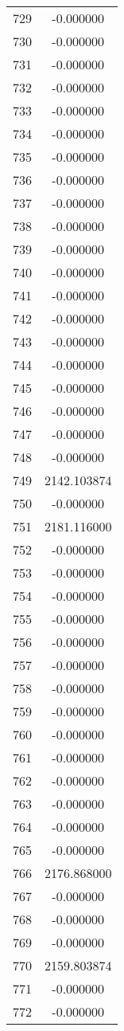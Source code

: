 \documentclass[12pt]{article}
\begin{document}
\begin{longtable}{@{}cc@{}}
729 & -0.000000 \\
730 & -0.000000 \\
731 & -0.000000 \\
732 & -0.000000 \\
733 & -0.000000 \\
734 & -0.000000 \\
735 & -0.000000 \\
736 & -0.000000 \\
737 & -0.000000 \\
738 & -0.000000 \\
739 & -0.000000 \\
740 & -0.000000 \\
741 & -0.000000 \\
742 & -0.000000 \\
743 & -0.000000 \\
744 & -0.000000 \\
745 & -0.000000 \\
746 & -0.000000 \\
747 & -0.000000 \\
748 & -0.000000 \\
749 & 2142.103874 \\
750 & -0.000000 \\
751 & 2181.116000 \\
752 & -0.000000 \\
753 & -0.000000 \\
754 & -0.000000 \\
755 & -0.000000 \\
756 & -0.000000 \\
757 & -0.000000 \\
758 & -0.000000 \\
759 & -0.000000 \\
760 & -0.000000 \\
761 & -0.000000 \\
762 & -0.000000 \\
763 & -0.000000 \\
764 & -0.000000 \\
765 & -0.000000 \\
766 & 2176.868000 \\
767 & -0.000000 \\
768 & -0.000000 \\
769 & -0.000000 \\
770 & 2159.803874 \\
771 & -0.000000 \\
772 & -0.000000 \\

\end{longtable}
\end{document}
